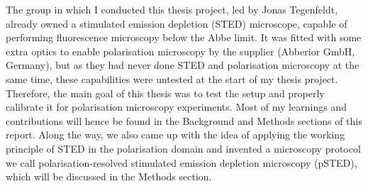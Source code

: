 The group in which I conducted this thesis project, led by Jonas Tegenfeldt, already owned a stimulated emission depletion (STED) microscope, capable of performing fluorescence microscopy below the Abbe limit. It was fitted with some extra optics to enable polarisation microscopy by the supplier (Abberior GmbH, Germany), but as they had never done STED and polarisation microscopy at the same time, these capabilities were untested at the start of my thesis project. Therefore, the main goal of this thesis was to test the setup and properly calibrate it for polarisation microscopy experiments. Most of my learnings and contributions will hence be found in the Background and Methods sections of this report. Along the way, we also came up with the idea of applying the working principle of STED in the polarisation domain and invented a microscopy protocol we call polarisation-resolved stimulated emission depletion microscopy (pSTED), which will be discussed in the Methods section.